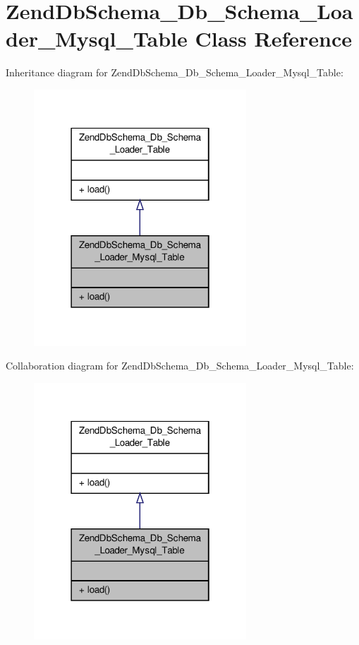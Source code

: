 \hypertarget{classZendDbSchema__Db__Schema__Loader__Mysql__Table}{\section{Zend\-Db\-Schema\-\_\-\-Db\-\_\-\-Schema\-\_\-\-Loader\-\_\-\-Mysql\-\_\-\-Table Class Reference}
\label{classZendDbSchema__Db__Schema__Loader__Mysql__Table}
}


Inheritance diagram for Zend\-Db\-Schema\-\_\-\-Db\-\_\-\-Schema\-\_\-\-Loader\-\_\-\-Mysql\-\_\-\-Table\-:\nopagebreak
\begin{figure}[H]
\begin{center}
\leavevmode
\includegraphics[width=226pt]{classZendDbSchema__Db__Schema__Loader__Mysql__Table__inherit__graph}
\end{center}
\end{figure}


Collaboration diagram for Zend\-Db\-Schema\-\_\-\-Db\-\_\-\-Schema\-\_\-\-Loader\-\_\-\-Mysql\-\_\-\-Table\-:\nopagebreak
\begin{figure}[H]
\begin{center}
\leavevmode
\includegraphics[width=226pt]{classZendDbSchema__Db__Schema__Loader__Mysql__Table__coll__graph}
\end{center}
\end{figure}

